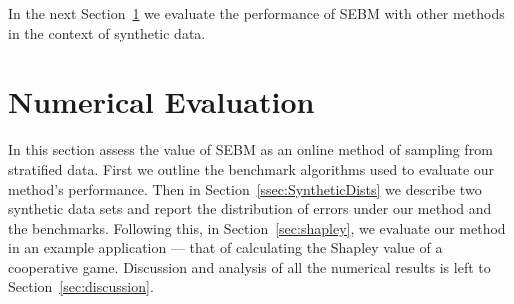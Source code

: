 





In the next Section~\ref{sec:application} we evaluate the performance of SEBM with other methods in the context of synthetic data.


\section{Numerical Evaluation}\label{sec:application}

In this section assess the value of SEBM as an online method of sampling from stratified data.
First we outline the benchmark algorithms used to evaluate our method's performance.
Then in Section~\ref{ssec:SyntheticDists}
we describe two synthetic data sets and report the distribution of errors under our method and the benchmarks.
Following this, in Section~\ref{sec:shapley}, we evaluate our method in an example application --- that of calculating the Shapley value of a cooperative game.
Discussion and analysis of all the numerical results is left to Section~\ref{sec:discussion}.



